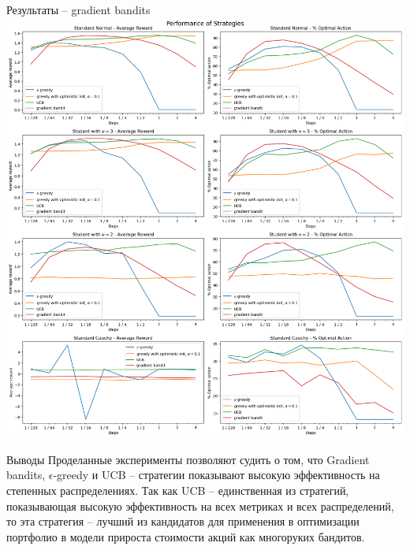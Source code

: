 \documentclass[11pt]{beamer} %
\begin{document}
    \begin{frame}{Результаты -- gradient bandits}
        \includegraphics[scale=0.13,center]{images/bandit_tester/overall.png}
    \end{frame}
    \begin{frame}{Выводы}
        Проделанные эксперименты позволяют судить о том, что Gradient bandits, $\epsilon$-greedy и UCB -- стратегии показывают высокую эффективность на степенных распределениях. Так как UCB -- единственная из стратегий, показывающая высокую эффективность на всех метриках и всех распределений, то эта стратегия -- лучший из кандидатов для применения в оптимизации портфолио в модели прироста стоимости акций как многоруких бандитов.
    \end{frame}
\end{document}
